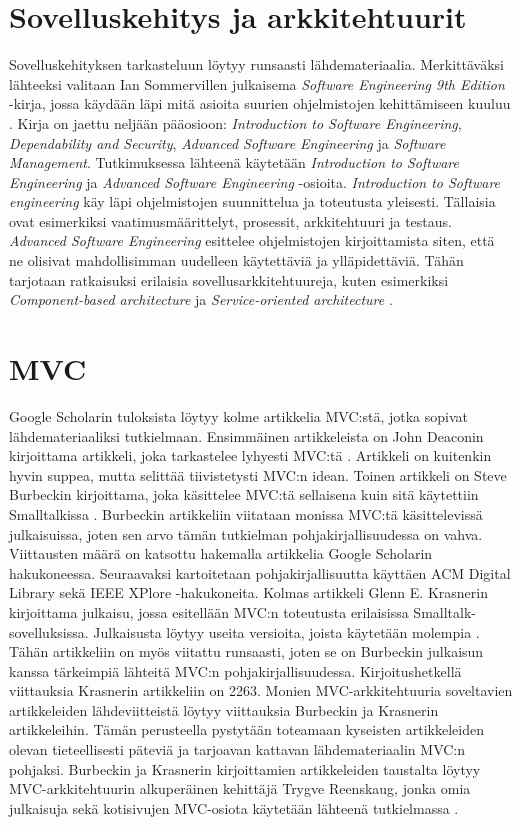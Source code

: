 \documentclass[utf8]{gradu3}
\begin{document}
\section{Sovelluskehitys ja arkkitehtuurit}
Sovelluskehityksen tarkasteluun löytyy runsaasti lähdemateriaalia. Merkittäväksi lähteeksi valitaan Ian Sommervillen julkaisema \textit{Software Engineering 9th Edition} -kirja, jossa käydään läpi mitä asioita suurien ohjelmistojen kehittämiseen kuuluu \parencite{Sommerville}. Kirja on jaettu neljään pääosioon: \textit{Introduction to Software Engineering}, \textit{Dependability and Security}, \textit{Advanced Software Engineering} ja \textit{Software Management}. Tutkimuksessa lähteenä käytetään \textit{Introduction to Software Engineering} ja \textit{Advanced Software Engineering} -osioita. \textit{Introduction to Software engineering} käy läpi ohjelmistojen suunnittelua ja toteutusta yleisesti. Tällaisia ovat esimerkiksi vaatimusmäärittelyt, prosessit, arkkitehtuuri ja testaus. \textit{Advanced Software Engineering} esittelee ohjelmistojen kirjoittamista siten, että ne olisivat mahdollisimman uudelleen käytettäviä ja ylläpidettäviä. Tähän tarjotaan ratkaisuksi erilaisia sovellusarkkitehtuureja, kuten esimerkiksi \textit{Component-based architecture} ja \textit{Service-oriented architecture} \parencite{Sommerville}.

\section{MVC}
Google Scholarin tuloksista löytyy kolme artikkelia MVC:stä, jotka sopivat 
lähdemateriaaliksi tutkielmaan. Ensimmäinen artikkeleista on John
Deaconin kirjoittama artikkeli, joka tarkastelee lyhyesti
MVC:tä \parencite{deacon}. Artikkeli on kuitenkin hyvin suppea, mutta selittää
tiivistetysti MVC:n idean. Toinen artikkeli on Steve Burbeckin kirjoittama, 
joka käsittelee
MVC:tä sellaisena kuin sitä käytettiin Smalltalkissa \parencite{burbeck}. Burbeckin
artikkeliin viitataan monissa MVC:tä käsittelevissä
julkaisuissa, joten sen arvo tämän tutkielman pohjakirjallisuudessa on
vahva. Viittausten määrä on katsottu hakemalla artikkelia Google
Scholarin hakukoneessa. Seuraavaksi kartoitetaan pohjakirjallisuutta käyttäen ACM Digital
Library sekä IEEE XPlore -hakukoneita. Kolmas artikkeli Glenn
E. Krasnerin kirjoittama julkaisu, jossa esitellään MVC:n toteutusta
erilaisissa Smalltalk-sovelluksissa. Julkaisusta löytyy useita
versioita, joista käytetään
molempia \parencite{krasner} \parencite{krasner_desc}. Tähän artikkeliin on
myös viitattu runsaasti, joten se on Burbeckin julkaisun kanssa
tärkeimpiä lähteitä MVC:n pohjakirjallisuudessa. Kirjoitushetkellä
viittauksia Krasnerin artikkeliin on 2263. Monien MVC-arkkitehtuuria soveltavien artikkeleiden
lähdeviitteistä löytyy viittauksia Burbeckin ja Krasnerin
artikkeleihin. Tämän perusteella pystytään toteamaan kyseisten
artikkeleiden olevan tieteellisesti päteviä ja tarjoavan kattavan
lähdemateriaalin MVC:n pohjaksi. Burbeckin ja Krasnerin kirjoittamien
artikkeleiden taustalta löytyy MVC-arkkitehtuurin alkuperäinen kehittäjä Trygve
Reenskaug, jonka omia julkaisuja sekä kotisivujen MVC-osiota käytetään 
lähteenä tutkielmassa \parencite{xerox}.
\end{document}
